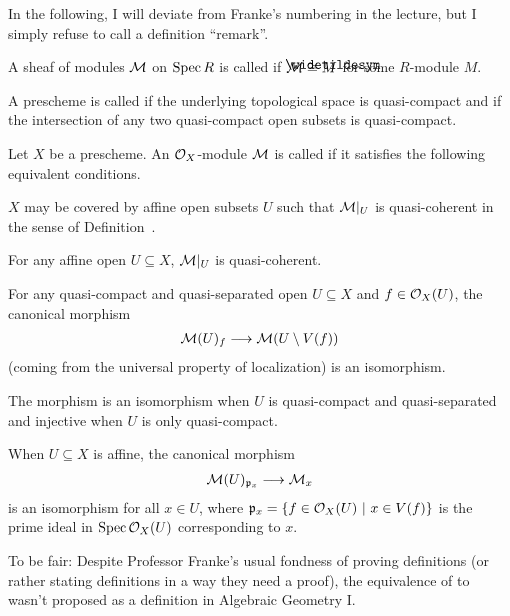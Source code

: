 \documentclass[a4paper,parskip=half,numbers=enddot, DIV=12]{scrreprt}
\begin{document}
	In the following, I will deviate from Franke's numbering in the lecture, but I simply refuse to call a definition ``remark''.
\begin{defi}
	A sheaf of modules $\mathcal{M}$ on $\operatorname{Spec} R$ is called  if $\Mm\cong \snake{M}$ for some $R$-module $M$.
\end{defi}
\begin{defi}
	A prescheme is called  if the underlying topological space is quasi-compact and  if the intersection of any two quasi-compact open subsets is quasi-compact.
\end{defi}

\begin{defi}
	Let $X$ be a prescheme. An $\mathcal{O}_X$-module $\mathcal{M}$ is called  if it satisfies the following equivalent conditions.
	\begin{alphanumerate}
		\item $X$ may be covered by affine open subsets $U$ such that $\mathcal{M}|_U$ is quasi-coherent in the sense of Definition~.
		\item For any affine open $U\subseteq X$, $\mathcal{M}|_U$ is quasi-coherent.
		\item For any quasi-compact and quasi-separated open $U\subseteq X$ and $f\in\mathcal{O}_X(U)$, the canonical morphism
		\begin{align}\lbl{eq:qcIso}
		\Mm(U)_f\morphism\Mm(U\setminus V(f))
		\end{align}
		(coming from the universal property of localization) is an isomorphism.
		\item The morphism  is an isomorphism when $U$ is quasi-compact and quasi-separated and injective when $U$ is only quasi-compact.
		\item When $U\subseteq X$ is affine, the canonical morphism
		\begin{align}\lbl{eq:qcIso2}
		\Mm(U)_{\pp_x}\morphism\Mm_x
		\end{align}
		is an isomorphism for all $x\in U$, where $\mathfrak{p}_x=\left\{f\in\mathcal{O}_X(U)\ \middle|\  x\in V(f)\right\}$ is the prime ideal in $\operatorname{Spec} \mathcal{O}_X(U)$ corresponding to $x$.
	\end{alphanumerate}
\end{defi}
\begin{rem*}
	To be fair: Despite Professor Franke's usual fondness of proving definitions (or rather stating definitions in a way they need a proof), the equivalence of  to  wasn't proposed as a definition in Algebraic Geometry I. 
\end{rem*}
\end{document}
